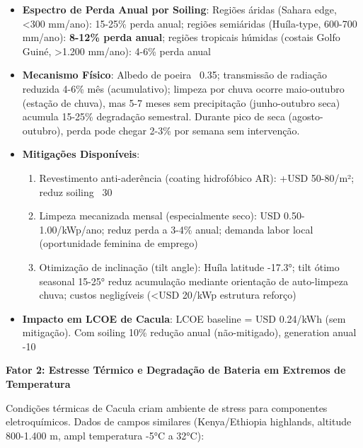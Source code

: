 \documentclass[12pt, a4paper]{article}
\begin{document}
\begin{itemize}
\item \textbf{Espectro de Perda Anual por Soiling}: Regiões áridas (Sahara edge, <300 mm/ano): 15-25\% perda anual; regiões semiáridas (Huíla-type, 600-700 mm/ano): \textbf{8-12\% perda anual}; regiões tropicais húmidas (costais Golfo Guiné, >1.200 mm/ano): 4-6\% perda anual
\item \textbf{Mecanismo Físico}: Albedo de poeira ~0.35; transmissão de radiação reduzida 4-6\% mês (acumulativo); limpeza por chuva ocorre maio-outubro (estação de chuva), mas 5-7 meses sem precipitação (junho-outubro seca) acumula 15-25\% degradação semestral. Durante pico de seca (agosto-outubro), perda pode chegar 2-3\% por semana sem intervenção.
\item \textbf{Mitigações Disponíveis}:
  \begin{enumerate}
  \item Revestimento anti-aderência (coating hidrofóbico AR): +USD 50-80/m²; reduz soiling ~30%
  \item Limpeza mecanizada mensal (especialmente seco): USD 0.50-1.00/kWp/ano; reduz perda a 3-4\% anual; demanda labor local (oportunidade feminina de emprego)
  \item Otimização de inclinação (tilt angle): Huíla latitude -17.3°; tilt ótimo seasonal 15-25° reduz acumulação mediante orientação de auto-limpeza chuva; custos negligíveis (<USD 20/kWp estrutura reforço)
  \end{enumerate}
\item \textbf{Impacto em LCOE de Cacula}: LCOE baseline = USD 0.24/kWh (sem mitigação). Com soiling 10\% redução anual (não-mitigado), generation anual -10%
\end{itemize}

\textbf{Fator 2: Estresse Térmico e Degradação de Bateria em Extremos de Temperatura}

Condições térmicas de Cacula criam ambiente de stress para componentes eletroquímicos. Dados de campos similares (Kenya/Ethiopia highlands, altitude 800-1.400 m, ampl temperatura -5°C a 32°C):
\end{document}
